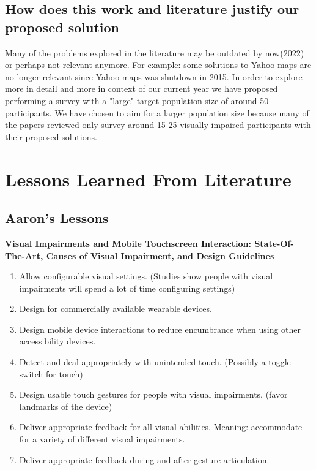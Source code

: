 \documentclass{article}
\begin{document}
\subsection{How does this work and literature justify our proposed solution}
Many of the problems explored in the literature may be outdated by now(2022) or perhaps not relevant anymore. For example: some solutions to Yahoo maps are no longer relevant since Yahoo maps was shutdown in 2015. In order to explore more in detail and more in context of our current year we have proposed performing a survey with a "large" target population size of around 50 participants. We have chosen to aim for a larger population size because many of the papers reviewed only survey around 15-25 visually impaired participants with their proposed solutions.


\section{Lessons Learned From Literature}


\subsection{Aaron's Lessons}
\cite{} \textbf{Visual Impairments and Mobile Touchscreen Interaction: State-Of-The-Art, Causes of Visual Impairment, and Design Guidelines} \cite{}
\begin{enumerate}
    \item Allow configurable visual settings. (Studies show people with visual impairments will spend a lot of time configuring settings) 
    \item Design for commercially available wearable devices. 
    \item Design mobile device interactions to reduce encumbrance when using other accessibility devices.
    \item Detect and deal appropriately with unintended touch. (Possibly a toggle switch for touch) 
    \item Design usable touch gestures for people with visual impairments. (favor landmarks of the device)
    \item Deliver appropriate feedback for all visual abilities. Meaning: accommodate for a variety of different visual impairments.
    \item Deliver appropriate feedback during and after gesture articulation.
\end{enumerate}
\end{document}
